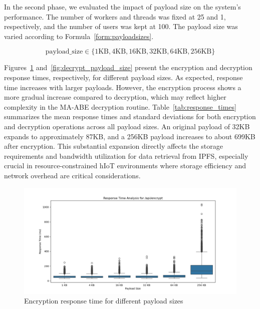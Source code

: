 \documentclass[cic,tc,english]{iiufrgs}
\begin{document}
            In the second phase, we evaluated the impact of payload size on the system's performance. The number of workers and threads was fixed at 25 and 1, respectively, and the number of users was kept at 100. The payload size was varied according to Formula~\ref{form:payloadsizes}.

            \begin{equation}
            \label{form:payloadsizes}
                \text{payload\_size} \in \{1\text{KB}, 4\text{KB}, 16\text{KB}, 32\text{KB}, 64\text{KB}, 256\text{KB}\}
            \end{equation}

            Figures~\ref{fig:encrypt_payload_size} and~\ref{fig:decrypt_payload_size} present the encryption and decryption response times, respectively, for different payload sizes. As expected, response time increases with larger payloads. However, the encryption process shows a more gradual increase compared to decryption, which may reflect higher complexity in the MA-ABE decryption routine. Table~\ref{tab:response_times} summarizes the mean response times and standard deviations for both encryption and decryption operations across all payload sizes. An original payload of 32KB expands to approximately 87KB, and a 256KB payload increases to about 699KB after encryption. This substantial expansion directly affects the storage requirements and bandwidth utilization for data retrieval from IPFS, especially crucial in resource-constrained hIoT environments where storage efficiency and network overhead are critical considerations. 
            

            \begin{figure}
                \centering
                \includegraphics[width=\textwidth]{images/phase2/response_time_api_encrypt.png}
                \caption{Encryption response time for different payload sizes}
                \label{fig:encrypt_payload_size}
            \end{figure}
\end{document}
